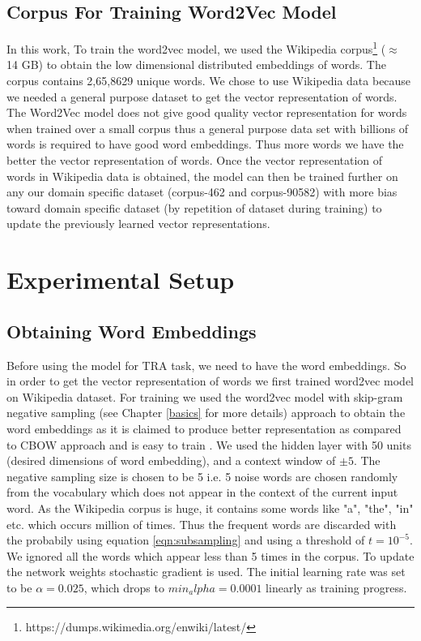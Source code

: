 \subsection{Corpus For Training Word2Vec Model}

In this work, To train the word2vec model, we used the Wikipedia corpus\footnote{https://dumps.wikimedia.org/enwiki/latest/} ($\approx$ 14 GB) to obtain the low dimensional distributed embeddings of words. The corpus contains 2,65,8629 unique words. We chose to use Wikipedia data because we needed a general purpose dataset to get the vector representation of words. The Word2Vec model does not give good quality vector representation for words when trained over a small corpus thus a general purpose data set with billions of words is required to have good word embeddings. Thus more words we have the better the vector representation of words. Once the vector representation of words in Wikipedia data is obtained, the model can then be trained further on any our domain specific dataset (corpus-462 and corpus-90582) with more bias toward domain specific dataset (by repetition of dataset during training) to update the previously learned vector representations. 

\section{Experimental Setup}

\subsection{Obtaining Word Embeddings} \label{get_word_embeddings}

Before using the model for TRA task, we need to have the word embeddings. So in order to get the vector representation of words we first trained word2vec model on Wikipedia dataset. For training we used the word2vec model with skip-gram negative sampling (see Chapter \ref{basics} for more details) approach to obtain the word embeddings as it is claimed to produce better representation as compared to CBOW approach and is easy to train \cite{w2v:mikolov_2013_efficien, w2v:mikolov_2013_distributed}. We used the hidden layer with 50 units (desired dimensions of word embedding), and a context window of $\pm 5$. The negative sampling size is chosen to be 5 i.e. 5 noise words are chosen randomly from the vocabulary which does not appear in the context of the current input word.
As the Wikipedia corpus is huge, it contains some words like "a", "the", "in" etc. which occurs million of times. Thus the frequent words are discarded with the probabily using equation \ref{eqn:subsampling} and using a threshold of $t = 10^{-5}$. We ignored all the words which appear less than 5 times in the corpus. To update the network weights stochastic gradient is used. The initial learning rate was set to be $\alpha=0.025$, which drops to $min_alpha = 0.0001$ linearly as training progress. 

